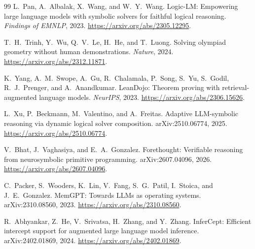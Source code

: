 \documentclass[11pt]{article}
\begin{document}
\begin{thebibliography}{99}
L.~Pan, A.~Albalak, X.~Wang, and W.~Y.~Wang.
Logic-LM: Empowering large language models with symbolic solvers for faithful
logical reasoning.
\emph{Findings of EMNLP}, 2023.
\url{https://arxiv.org/abs/2305.12295}.

T.~H.~Trinh, Y.~Wu, Q.~V.~Le, H.~He, and T.~Luong.
Solving olympiad geometry without human demonstrations.
\emph{Nature}, 2024.
\url{https://arxiv.org/abs/2312.11871}.

K.~Yang, A.~M.~Swope, A.~Gu, R.~Chalamala, P.~Song, S.~Yu, S.~Godil,
R.~J.~Prenger, and A.~Anandkumar.
LeanDojo: Theorem proving with retrieval-augmented language models.
\emph{NeurIPS}, 2023.
\url{https://arxiv.org/abs/2306.15626}.

L.~Xu, P.~Beckmann, M.~Valentino, and A.~Freitas.
Adaptive LLM-symbolic reasoning via dynamic logical solver composition.
arXiv:2510.06774, 2025.
\url{https://arxiv.org/abs/2510.06774}.

V.~Bhat, J.~Vaghasiya, and E.~A.~Gonzalez.
Forethought: Verifiable reasoning from neurosymbolic primitive programming.
arXiv:2607.04096, 2026.
\url{https://arxiv.org/abs/2607.04096}.

C.~Packer, S.~Wooders, K.~Lin, V.~Fang, S.~G.~Patil, I.~Stoica, and
J.~E.~Gonzalez.
MemGPT: Towards LLMs as operating systems.
arXiv:2310.08560, 2023.
\url{https://arxiv.org/abs/2310.08560}.

R.~Abhyankar, Z.~He, V.~Srivatsa, H.~Zhang, and Y.~Zhang.
InferCept: Efficient intercept support for augmented large language model
inference.
arXiv:2402.01869, 2024.
\url{https://arxiv.org/abs/2402.01869}.

\end{thebibliography}
\end{document}
